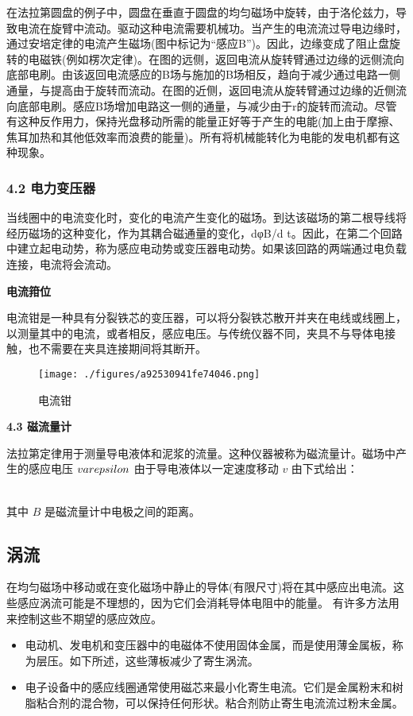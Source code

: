 在法拉第圆盘的例子中，圆盘在垂直于圆盘的均匀磁场中旋转，由于洛伦兹力，导致电流在旋臂中流动。驱动这种电流需要机械功。当产生的电流流过导电边缘时，通过安培定律的电流产生磁场(图中标记为“感应B”)。因此，边缘变成了阻止盘旋转的电磁铁(例如楞次定律)。在图的远侧，返回电流从旋转臂通过边缘的远侧流向底部电刷。由该返回电流感应的B场与施加的B场相反，趋向于减少通过电路一侧通量，与提高由于旋转而流动。在图的近侧，返回电流从旋转臂通过边缘的近侧流向底部电刷。感应B场增加电路这一侧的通量，与减少由于r的旋转而流动。尽管有这种反作用力，保持光盘移动所需的能量正好等于产生的电能(加上由于摩擦、焦耳加热和其他低效率而浪费的能量)。所有将机械能转化为电能的发电机都有这种现象。
\subsubsection{4.2 电力变压器}
当线圈中的电流变化时，变化的电流产生变化的磁场。到达该磁场的第二根导线将经历磁场的这种变化，作为其耦合磁通量的变化，dφB/d t。因此，在第二个回路中建立起电动势，称为感应电动势或变压器电动势。如果该回路的两端通过电负载连接，电流将会流动。

\textbf{电流箝位}

电流钳是一种具有分裂铁芯的变压器，可以将分裂铁芯散开并夹在电线或线圈上，以测量其中的电流，或者相反，感应电压。与传统仪器不同，夹具不与导体电接触，也不需要在夹具连接期间将其断开。
\begin{figure}[ht]
\centering
\texttt{[image: ./figures/a92530941fe74046.png]}
\caption{电流钳} \label{fig_DCGY_8}
\end{figure}

\textbf{4.3 磁流量计}

法拉第定律用于测量导电液体和泥浆的流量。这种仪器被称为磁流量计。磁场中产生的感应电压 $\\varepsilon$ 由于导电液体以一定速度移动 $v$ 由下式给出：

\\[\\varepsilon = B \\cdot L \\cdot v\\]

其中 $B$ 是磁流量计中电极之间的距离。

\subsection{涡流}
在均匀磁场中移动或在变化磁场中静止的导体(有限尺寸)将在其中感应出电流。这些感应涡流可能是不理想的，因为它们会消耗导体电阻中的能量。 有许多方法用来控制这些不期望的感应效应。
\begin{itemize}
\item 电动机、发电机和变压器中的电磁体不使用固体金属，而是使用薄金属板，称为层压。如下所述，这些薄板减少了寄生涡流。
\item 电子设备中的感应线圈通常使用磁芯来最小化寄生电流。它们是金属粉末和树脂粘合剂的混合物，可以保持任何形状。粘合剂防止寄生电流流过粉末金属。
\end{itemize}
